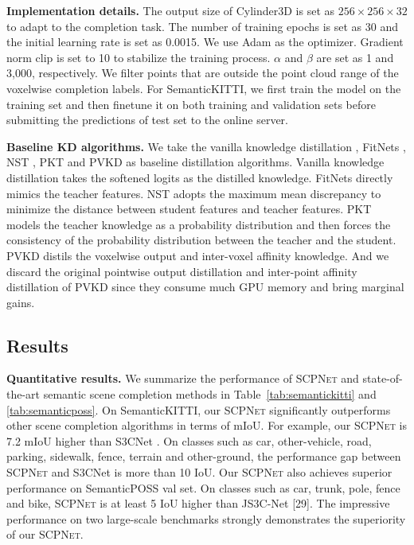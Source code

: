 \documentclass[10pt,twocolumn,letterpaper]{article}
\newcommand{\methodname}{\textsc{SCPNet}}
\begin{document}
\textbf{Implementation details.}
The output size of Cylinder3D is set as $256\times256\times32$ to adapt to the completion task. The number of training epochs is set as 30 and the initial learning rate is set as 0.0015. We use Adam \cite{luisroldao2022} as the optimizer. Gradient norm clip is set to 10 to stabilize the training process. $\alpha$ and $\beta$ are set as 1 and 3,000, respectively. We filter points that are outside the point cloud range of the voxelwise completion labels. For SemanticKITTI, we first train the model on the training set and then finetune it on both training and validation sets before submitting the predictions of test set to the online server.

\textbf{Baseline KD algorithms.}
We take the vanilla knowledge distillation \cite{nikolaospassalisandanastasiostefas2021}, FitNets \cite{yuenanhou2020}, NST \cite{benfei2020}, PKT \cite{geoffreyhinton2015} and PVKD \cite{luisroldao2018} as baseline distillation algorithms. Vanilla knowledge distillation takes the softened logits as the distilled knowledge. FitNets directly mimics the teacher features. NST adopts the maximum mean discrepancy to minimize the distance between student features and teacher features. PKT models the teacher knowledge as a probability distribution and then forces the consistency of the probability distribution between the teacher and the student. PVKD distils the voxelwise output and inter-voxel affinity knowledge. And we discard the original pointwise output distillation and inter-point affinity distillation of PVKD since they consume much GPU memory and bring marginal gains.

\subsection{Results}

\textbf{Quantitative results.}
We summarize the performance of \methodname{} and state-of-the-art semantic scene completion methods in Table~\ref{tab:semantickitti} and \ref{tab:semanticposs}. On SemanticKITTI, our \methodname{} significantly outperforms other scene completion algorithms in terms of mIoU. For example, our \methodname{} is 7.2 mIoU higher than S3CNet \cite{diederikpkingma2015}. On classes such as car, other-vehicle, road, parking, sidewalk, fence, terrain and other-ground, the performance gap between \methodname{} and S3CNet is more than 10 IoU. Our \methodname{} also achieves superior performance on SemanticPOSS val set. On classes such as car, trunk, pole, fence and bike, \methodname{} is at least 5 IoU higher than JS3C-Net [29]. The impressive performance on two large-scale benchmarks strongly demonstrates the superiority of our \methodname{}.
\end{document}
